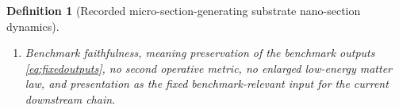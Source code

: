 \documentclass[11pt]{article}
\newcommand{\MicroSectionShell}[1]{\mathcal Z_{#1}^{\mathrm{microsec}}}
\newcommand{\NanoSectionProj}[1]{\Pi_{#1}^{\mathrm{nanosec}}}
\newcommand{\NanoSectionFiber}[2]{\mathcal F_{#1}^{\mathrm{nanosec}}(#2)}
\newcommand{\NanoSectionFunctional}[1]{\mathscr N_{#1}^{\mathrm{nanosec}}}
\newcommand{\NanoSectionShell}[1]{\mathcal Z_{#1}^{\mathrm{nanosec}}}
\newtheorem{definition}{Definition}
\begin{document}
\begin{definition}[Recorded micro-section-generating substrate nano-section dynamics]
\begin{enumerate}
\[\begin{array}{l}
    \NanoSectionFunctional{\sigma}(p)
    =
    \displaystyle\min_{q\in\NanoSectionFiber{\sigma}{\NanoSectionProj{\sigma}(p)}}
    \NanoSectionFunctional{\sigma}(q)
    \end{array}
    \right\},
    \]
    and
    \[
    \NanoSectionProj{\sigma}\big|_{\NanoSectionShell{\sigma}}
    :
    \NanoSectionShell{\sigma}
    \xrightarrow{\cong}
    \MicroSectionShell{\sigma}
    \]
    is a diffeomorphism.
    \item Benchmark faithfulness, meaning preservation of the benchmark outputs \eqref{eq:fixedoutputs}, no second operative metric, no enlarged low-energy matter law, and presentation as the fixed benchmark-relevant input for the current downstream chain.
\end{enumerate}
\end{definition}
\end{document}
